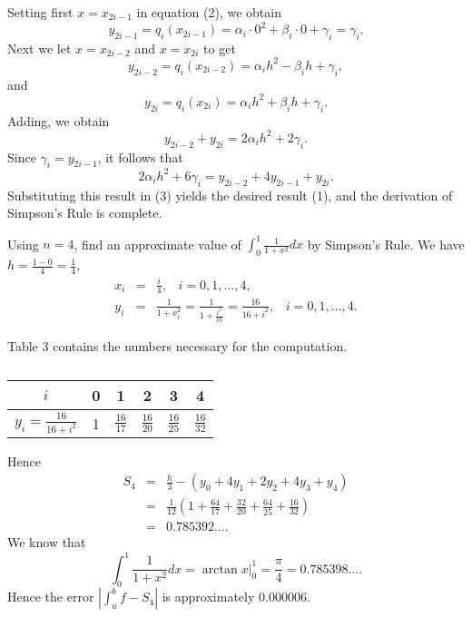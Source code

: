 \noindent Setting first $x = x_{2i-1}$ in equation (2), we obtain
$$
y_{2i-1} = q_i(x_{2i-1}) = \alpha_i \cdot 0^2 + \beta_i \cdot 0 + \gamma_i = \gamma_i.
$$
\noindent Next we let $x = x_{2i-2}$ and $x = x_{2i}$ to get
$$
y_{2i-2} = q_i(x_{2i-2}) = \alpha_i h^2 - \beta_{i}h + \gamma_i, 
$$
\noindent and
$$
y_{2i} = q_i(x_{2i}) = \alpha_i h^2 + \beta_i h + \gamma_i.
$$
\noindent Adding, we obtain
$$
y_{2i-2} + y_{2i} = 2\alpha_i h^2 + 2\gamma_i.
$$
\noindent Since $\gamma_i = y_{2i-1}$, it follows that
$$
2\alpha_i h^2 + 6\gamma_i = y_{2i-2} + 4y_{2i-1} + y_{2i}.
$$
\noindent Substituting this result in (3) yields the desired result (1), and the derivation of Simpson's Rule is complete.

\begin{example}
Using $n = 4$, find an approximate value of $\int_0^1 \frac{1}{1+ x^2} dx$ by Simpson's Rule. We have $h = \frac{1 - 0}{4} = \frac{1}{4}$, 
\begin{eqnarray*}
x_i &=& \frac{i}{4}, \;\;\; i = 0,1,..., 4,\\
y_i &=& \frac{1}{1 + x_i^2} = \frac{1}{1 + \frac{i^2}{16}} = \frac{16}{16 + i^2}, \;\;\; i = 0, 1,..., 4.
\end{eqnarray*}

\noindent Table 3 contains the numbers necessary for the computation.

\begin{table}\label{table 8.3}
\centering
\begin{tabular}{c|c|c|c|c|c} \hline
$i$& 0 & 1 & 2 & 3 & 4\vspace {1ex}\\ \hline
$y_i = \frac{16}{16 + i^2}$ & 1 &$\frac{16}{17}$&$\frac{16}{20}$&$\frac{16}{25}$&$\frac{16}{32}$ \vspace {1ex}\\ \hline
\end{tabular}
\caption{}
\end{table}

\noindent Hence 
\begin{eqnarray*}
S_4 &=& \frac{h}{3} - (y_0 + 4y_1 + 2y_2 + 4y_3 + y_4)\\
&=& \frac{1}{12} (1 + \frac{64}{17} + \frac{32}{20} + \frac{64}{25} + \frac{16}{32}) \\
&=& 0.785392....
\end{eqnarray*}
\noindent We know that 
$$
\int_0^1\frac{1}{1 + x^2} dx = \arctan x \big|_0^1 = \frac{\pi}{4} = 0.785398....
$$
\noindent Hence the error $|\int_a^b f - S_4|$ is approximately 0.000006.
\end{example}

